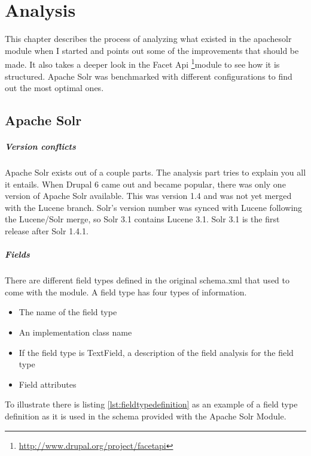 \chapter{Analysis}
This chapter describes the process of analyzing what existed in the apachesolr module when I started and points out some of the improvements that should be made. It also takes a deeper look in the Facet Api \footnote{\url{http://www.drupal.org/project/facetapi}}module to see how it is structured. 
Apache Solr was benchmarked with different configurations to find out the most optimal ones. 

\section{Apache Solr}
\paragraph{Version conflicts}
Apache Solr exists out of a couple parts. The analysis part tries to explain you all it entails. When Drupal 6 came out and became popular, there was only one version of Apache Solr available. This was version 1.4 and was not yet merged with the Lucene branch. Solr's version number was synced with Lucene following the Lucene/Solr merge, so Solr 3.1 contains Lucene 3.1. Solr 3.1 is the first release after Solr 1.4.1.

\paragraph{Fields}
There are different field types defined in the original schema.xml that used to come with the module. A field type has four types of information.
\begin{itemize}
  \item The name of the field type
  \item An implementation class name
  \item If the field type is TextField, a description of the field analysis for the field type
  \item Field attributes
\end{itemize}
To illustrate there is listing \ref{lst:fieldtypedefinition} as an example of a field type definition as it is used in the schema provided with the Apache Solr Module.

